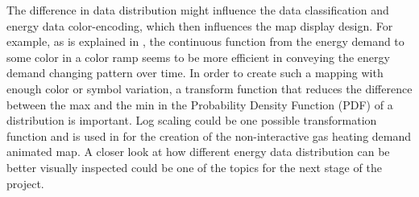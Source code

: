 The difference in data distribution might influence the data
classification and energy data color-encoding, which then influences
the map display design. For example, as is explained in ,
the continuous function from the energy demand to some color in a
color ramp seems to be more efficient in conveying the energy demand
changing pattern over time. In order to create such a mapping with
enough color or symbol variation, a transform function that reduces
the difference between the max and the min in the Probability Density
Function (PDF) of a distribution is important. Log scaling could be
one possible transformation function and is used in  for
the creation of the non-interactive gas heating demand animated map. A
closer look at how different energy data distribution can be better
visually inspected could be one of the topics for the next stage of
the project.

